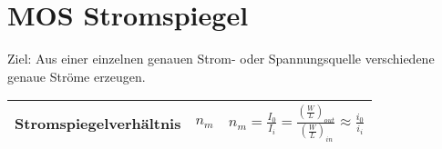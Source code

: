 \section{MOS Stromspiegel}
Ziel: Aus einer einzelnen genauen Strom- oder Spannungsquelle verschiedene genaue Ströme erzeugen.

\begin{tabularx}{\linewidth}{|l|l|X|}
	\hline
	Stromspiegelverhältnis & $n_m$ & $n_m = \frac{I_0}{I_i} = \frac{(\frac{W}{L})_{out}}{(\frac{W}{L})_{in}} \approx \frac{i_0}{i_i}$
	\\ \hline
\end{tabularx}
